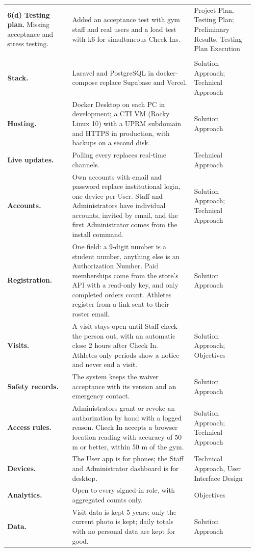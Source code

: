 \begin{center}
\begin{longtable}{L{3.3cm} L{6.4cm} L{3.7cm}}
\addlinespace
\textbf{6(d) Testing plan.} Missing acceptance and stress testing. & Added an acceptance test with gym staff and real users and a load test with k6 for simultaneous Check Ins. & Project Plan, Testing Plan; Preliminary Results, Testing Plan Execution \\
\addlinespace
\midrule
{} \\
\midrule
\textbf{Stack.} & Laravel and PostgreSQL in docker-compose replace Supabase and Vercel. & Solution Approach; Technical Approach \\
\addlinespace
\textbf{Hosting.} & Docker Desktop on each PC in development; a CTI VM (Rocky Linux 10) with a UPRM subdomain and HTTPS in production, with backups on a second disk. & Solution Approach \\
\addlinespace
\textbf{Live updates.} & Polling every  replaces real-time channels. & Technical Approach \\
\addlinespace
\textbf{Accounts.} & Own accounts with email and password replace institutional login, one device per User. Staff and Administrators have individual accounts, invited by email, and the first Administrator comes from the install command. & Solution Approach; Technical Approach \\
\addlinespace
\textbf{Registration.} & One field: a 9-digit number is a student number, anything else is an Authorization Number. Paid memberships come from the store's API with a read-only key, and only completed orders count. Athletes register from a link sent to their roster email. & Solution Approach \\
\addlinespace
\textbf{Visits.} & A visit stays open until Staff check the person out, with an automatic close 2 hours after Check In. Athletes-only periods show a notice and never end a visit. & Solution Approach; Objectives \\
\addlinespace
\textbf{Safety records.} & The system keeps the waiver acceptance with its version and an emergency contact. & Solution Approach \\
\addlinespace
\textbf{Access rules.} & Administrators grant or revoke an authorization by hand with a logged reason. Check In accepts a browser location reading with accuracy of 50 m or better, within 50 m of the gym. & Solution Approach; Technical Approach \\
\addlinespace
\textbf{Devices.} & The User app is for phones; the Staff and Administrator dashboard is for desktop. & Technical Approach, User Interface Design \\
\addlinespace
\textbf{Analytics.} & Open to every signed-in role, with aggregated counts only. & Objectives \\
\addlinespace
\textbf{Data.} & Visit data is kept 5 years; only the current photo is kept; daily totals with no personal data are kept for good. & Solution Approach \\
\end{longtable}
\end{center}
